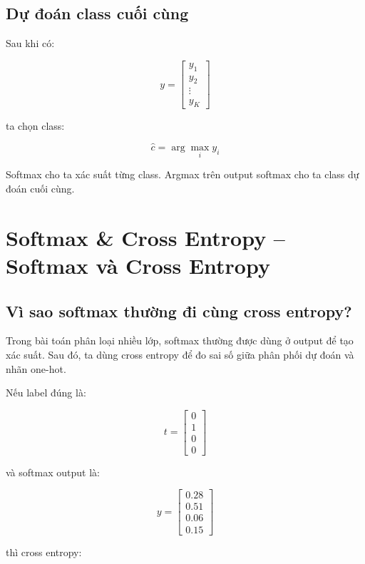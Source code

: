 \subsection{Dự đoán class cuối cùng}

Sau khi có:

\[
    y =
    \begin{bmatrix}
    y_1\\
    y_2\\
    \vdots\\
    y_K
    \end{bmatrix}
\]

ta chọn class:

\[
    \hat{c}
    =
    \arg\max_i y_i
\]

\begin{ghinho}
Softmax cho ta xác suất từng class. Argmax trên output softmax cho ta class dự đoán cuối cùng.
\end{ghinho}

\section{Softmax \& Cross Entropy -- Softmax và Cross Entropy}

\subsection{Vì sao softmax thường đi cùng cross entropy?}

Trong bài toán phân loại nhiều lớp, softmax thường được dùng ở output để tạo xác suất. Sau đó, ta dùng cross entropy để đo sai số giữa phân phối dự đoán và nhãn one-hot.

Nếu label đúng là:

\[
    t =
    \begin{bmatrix}
    0\\
    1\\
    0\\
    0
    \end{bmatrix}
\]

và softmax output là:

\[
    y =
    \begin{bmatrix}
    0.28\\
    0.51\\
    0.06\\
    0.15
    \end{bmatrix}
\]

thì cross entropy:

